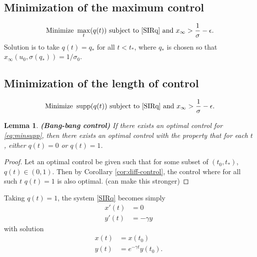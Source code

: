 \documentclass[english,12pt]{article}
\newtheorem{lemma}{Lemma}
\DeclareMathOperator\supp{supp}
\begin{document}
\subsection{Minimization of the maximum control}
\begin{align} \label{eq:minmax}
\text{ Minimize } \max_t(q(t)) \text{ subject to } \eqref{SIRq} \text{ and } x_\infty > \frac{1}{\sigma} - \epsilon.
\end{align}
Solution is to take $q(t)=q_*$ for all $t<t_*$, where $q_*$ is chosen so that $x_\infty(u_0,\sigma(q_*))=1/\sigma_0$.


\subsection{Minimization of the length of control}
\begin{align} \label{eq:minsupp}
\text{ Minimize } \supp(q(t)) \text{ subject to } \eqref{SIRq} \text{ and } x_\infty > \frac{1}{\sigma} - \epsilon.
\end{align}

\begin{lemma} \label{lem:maxq}
    {\bf (Bang-bang control)}
    If there exists an optimal control for \eqref{eq:minsupp}, then there exists
    an optimal control with the property that for each $t$, either $q(t)=0$ or $q(t)=1$.
\end{lemma}
\begin{proof}
    Let an optimal control be given such that for some subset of $(t_0,t_*)$, $q(t)\in(0,1)$.
    Then by Corollary \ref{cor:diff-control}, the control where for all such $t$ $q(t)=1$
    is also optimal.  (can make this stronger)
\end{proof}

Taking $q(t)=1$, the system \eqref{SIRq} becomes simply
\begin{subequations}
\begin{align}
    x'(t) & = 0 \\
    y'(t) & = - \gamma y
\end{align}
\end{subequations}
with solution
\begin{subequations} \label{qone}
\begin{align}
    x(t) & = x(t_0) \\
    y(t) & = e^{-\gamma t} y(t_0).
\end{align}
\end{subequations}
\end{document}
